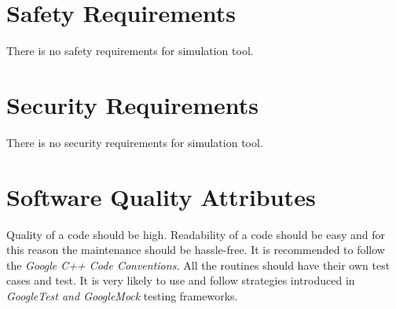 \section{Safety Requirements}
	\begin{comment}
		$<$Specify those requirements that are concerned with possible loss, damage, or 
		harm that could result from the use of the product. Define any safeguards or 
		actions that must be taken, as well as actions that must be prevented. Refer to 
		any external policies or regulations that state safety issues that affect the 
		product’s design or use. Define any safety certifications that must be 
		satisfied.$>$
	\end{comment}
	There is no safety requirements for simulation tool.
\section{Security Requirements}
	\begin{comment}
		$<$Specify any requirements regarding security or privacy issues surrounding use 
		of the product or protection of the data used or created by the product. Define 
		any user identity authentication requirements. Refer to any external policies or 
		regulations containing security issues that affect the product. Define any 
		security or privacy certifications that must be satisfied.$>$
	\end{comment}
	There is no security requirements for simulation tool.
\section{Software Quality Attributes}
	\begin{comment}
		$<$Specify any additional quality characteristics for the product that will be 
		important to either the customers or the developers. Some to consider are: 
		adaptability, availability, correctness, flexibility, interoperability, 
		maintainability, portability, reliability, reusability, robustness, testability, 
		and usability. Write these to be specific, quantitative, and verifiable when 
		possible. At the least, clarify the relative preferences for various attributes, 
		such as ease of use over ease of learning.$>$
	\end{comment}
	{
		Quality of a code should be high. Readability of a code should be easy and for this reason the maintenance should be hassle-free. It is recommended to follow the \emph{Google C++ Code Conventions.}
	}
	{
		All the routines should have their own test cases and test. It is very likely to use and follow strategies introduced in \emph{GoogleTest and GoogleMock} testing frameworks.
	}
